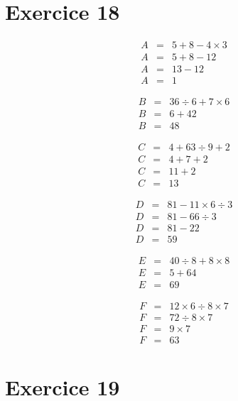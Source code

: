 \section*{Exercice 18}
 \vspace*{-1cm}
 
 
\begin{multicols}{3}
	\begin{eqnarray*}
		A &=&  5 + 8 - 4 \times 3 \\
		A &=& 5 + 8 - 12 \\
		A &=& 13 - 12 \\
		A &=& 1
	\end{eqnarray*}

	\begin{eqnarray*}
		B &=& 36 \div 6 + 7 \times 6 \\
		B &=& 6 + 42 \\
		B &=& 48 
	\end{eqnarray*}

	\begin{eqnarray*}
		C &=& 4 + 63 \div 9 + 2 \\
		C &=& 4 + 7 + 2 \\
		C &=& 11 + 2 \\
		C &=& 13
	\end{eqnarray*}

	\begin{eqnarray*}
		D &=&  81 - 11 \times 6 \div 3 \\
		D &=& 81 - 66 \div 3 \\
		D &=& 81 - 22 \\
		D &=& 59
	\end{eqnarray*}

	\begin{eqnarray*}
		E &=& 40 \div 8 + 8 \times 8 \\
		E &=& 5 + 64 \\
		E &=& 69
	\end{eqnarray*}

	\begin{eqnarray*}
		F &=&  12 \times 6 \div 8 \times 7 \\
		F &=& 72 \div 8 \times 7 \\
		F &=& 9 \times 7 \\
		F &=& 63
	\end{eqnarray*}
\end{multicols}

\section*{Exercice 19}
 \vspace*{-1cm}
 
